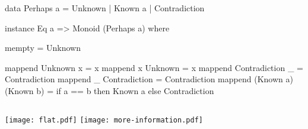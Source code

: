 

\begin{frame}[fragile]

\begin{haskellcode}
data Perhaps a = Unknown | Known a | Contradiction
\end{haskellcode}

\pnl

\begin{haskellcode}
instance Eq a => Monoid (Perhaps a) where

  mempty = Unknown

  mappend Unknown x           = x
  mappend x       Unknown     = x
  mappend Contradiction _     = Contradiction
  mappend _     Contradiction = Contradiction
  mappend (Known a) (Known b) =
    if a == b
      then Known a
      else Contradiction
\end{haskellcode}

\end{frame}





\begin{frame}
\begin{columns}
\texttt{[image: flat.pdf]}
\pause
{}
\texttt{[image: more-information.pdf]}
\end{columns}
\end{frame}

